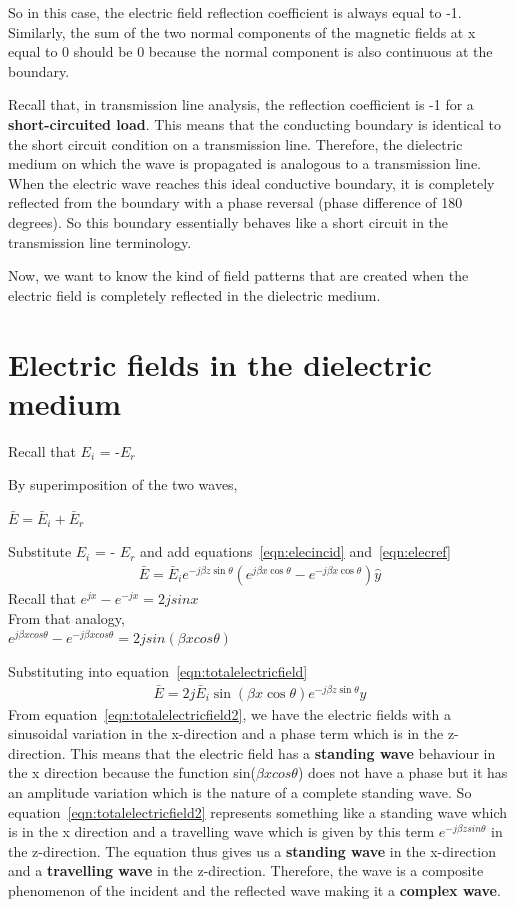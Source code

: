 So in this case, the electric field reflection coefficient is always equal to -1. Similarly, the sum of the two normal components of the
magnetic fields at x equal to 0 should be 0 because the normal component is also continuous at the boundary.

Recall that, in transmission line analysis, the reflection coefficient is -1 for a \textbf{short-circuited load}. This means that the conducting boundary is identical to the short circuit condition on a transmission line. Therefore, the dielectric medium on which the wave is propagated is analogous to a transmission line. When the electric wave reaches this ideal conductive boundary, it is completely reflected from the boundary with a phase reversal (phase difference of 180 degrees). So this boundary essentially behaves like a short circuit in the transmission line terminology.

Now, we want to know the kind of field patterns that are created when the electric field is completely reflected in the dielectric medium.

\section{Electric fields in the dielectric medium}
Recall that $E_{i}$ = -$E_{r}$

By superimposition of the two waves,

$\bar{E}= \bar{E}_i + \bar{E}_r$

Substitute $E_i$ = - $E_r$ and add equations~\eqref{eqn:elecincid} and~\eqref{eqn:elecref}
\begin{align}
\bar{E}= \bar{E}_i e^{-j\beta z\sin\theta} (e^{j\beta x\cos\theta }- e^{-j\beta x\cos\theta}) \hat{y}
\label{eqn:totalelectricfield}
\end{align}
Recall that $e^{jx} - e^{-jx} = 2jsinx$\\ 
From that analogy,\\ 
$e^{j\beta xcos\theta} - e^{-j\beta xcos\theta} = 2jsin(\beta xcos\theta)$

Substituting into equation~\ref{eqn:totalelectricfield}
\begin{align}
\bar{E}=2j \bar{E}_i \sin(\beta x\cos\theta) e^{-j\beta z\sin\theta} \hat{y}
\label{eqn:totalelectricfield2}
\end{align}
From equation~\ref{eqn:totalelectricfield2}, we have the electric fields with a sinusoidal variation in the x-direction and a phase term which is in the z-direction. This means that the electric field has a \textbf{standing wave} behaviour in the x direction because the function {sin({$\beta xcos\theta$})} does not have a phase but it has an amplitude variation which is the nature of a complete standing wave. So equation~\ref{eqn:totalelectricfield2} represents something like a standing wave which is in the x direction and a travelling wave which is given by this term \textbf{$e^{-j\beta zsin\theta}$} in the z-direction. The equation thus gives us a \textbf{standing wave} in the x-direction and a \textbf{travelling wave} in the z-direction. Therefore, the wave is a composite phenomenon of the incident and the reflected wave making it a \textbf{complex wave}.

